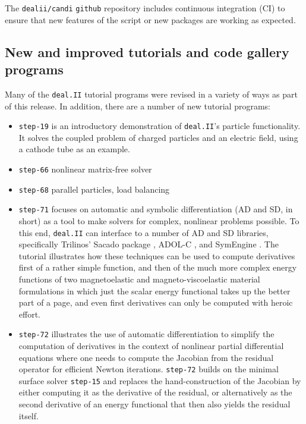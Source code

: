 \documentclass{ansarticle-preprint}
\newcommand{\specialword}[1]{\texttt{#1}}
\newcommand{\dealii}{{\specialword{deal.II}}\xspace}
\begin{document}
The \texttt{dealii/candi} \texttt{github} repository includes continuous
integration (CI) to ensure that new features of the script or new packages
are working as expected.


\subsection{New and improved tutorials and code gallery programs}
\label{subsec:steps}

Many of the \dealii{} tutorial programs were revised in a variety of
ways as part of this release. In addition, there are a number of new tutorial programs:
\begin{itemize}
\item \texttt{step-19} is an introductory demonstration of \dealii{}'s
  particle functionality. It solves the coupled problem of
  charged particles and an electric field, using a cathode tube as an
  example.

\item \texttt{step-66} nonlinear matrix-free solver 
  
\item \texttt{step-68} parallel particles, load balancing 
  
\item \texttt{step-71} focuses on automatic and symbolic
  differentiation (AD and SD, in short) as a tool to make solvers for complex,
  nonlinear problems possible. To this end, \dealii{} can interface to a number
  of AD and SD libraries, specifically Trilinos' Sacado package
  \cite{Bartlett2006a}, ADOL-C \cite{Griewank1996a}, and
  SymEngine \cite{symengine-web-page}. The tutorial
  illustrates how these techniques can be used to compute derivatives
  first of a rather simple function, and then of the much more complex
  energy functions of two magnetoelastic and magneto-viscoelastic
  material formulations in which just the scalar energy functional
  takes up the better part of a page, and even first derivatives can
  only be computed with heroic effort.

\item \texttt{step-72} illustrates the use of automatic
  differentiation to simplify the computation of derivatives in the
  context of nonlinear partial differential equations where one needs
  to compute the Jacobian from the residual operator for efficient
  Newton iterations. \texttt{step-72} builds on the minimal surface
  solver \texttt{step-15} and replaces the hand-construction of the
  Jacobian by either computing it as the derivative of the residual,
  or alternatively as the second derivative of an energy functional
  that then also yields the residual itself.


\end{itemize}
\end{document}

